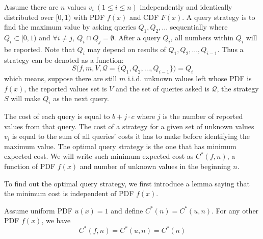 \begin{definition}\label{def:query}

Assume there are $n$ values $v_i ~(1 \leq i \leq n)$ independently and
identically distributed over $[0, 1)$ with PDF $f(x)$ and CDF $F(x)$.  A query
strategy is to find the maximum value by asking queries $Q_1, Q_2, \ldots$
sequentially where $Q_i \subset [0, 1)$ and $\forall i \neq j, ~Q_i \cap Q_j =
\emptyset$.  After a query $Q_i$, all numbers within $Q_i$ will be reported.
Note that $Q_i$ may depend on results of $Q_1, Q_2, \ldots, Q_{i-1}$. Thus a
strategy can be denoted as a function:
\begin{displaymath}
	S\big(f, m, V, \mathcal Q = \{Q_1, Q_2, \ldots, Q_{i-1} \}\big) = Q_i
\end{displaymath}
which means, suppose there are still $m$ i.i.d. unknown values left whose PDF
is $f(x)$, the reported values set is $V$ and the set of queries asked is
$\mathcal Q$, the strategy $S$ will make $Q_i$ as the next query.

The cost of each query is equal to $b+j \cdot c$ where $j$ is the number of
reported values from that query. The cost of a strategy for a given set of
unknown values $v_i$ is equal to the sum of all queries' costs it has to make
before identifying the maximum value. The optimal query strategy is the one
that has minimum expected cost.  We will write such minimum expected cost as
$C^*(f, n)$, a function of PDF $f(x)$ and number of unknown values in the
beginning $n$.

\end{definition}

To find out the optimal query strategy, we first introduce
a lemma saying that the minimum cost is independent of PDF $f(x)$.

\begin{lemma}\label{lemma:uniform}

Assume uniform PDF $u(x) = 1$ and define $C^*(n) = C^*(u, n)$.
For any other PDF $f(x)$, we have 
\[C^*(f, n) = C^*(u, n) = C^*(n)\]

\end{lemma}

